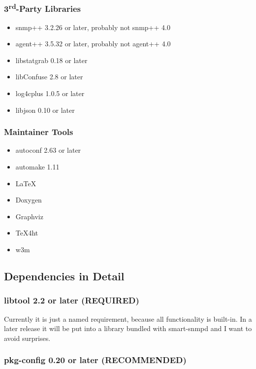 \subsubsection{3\textsuperscript{rd}-Party Libraries}

\begin{itemize}
\item{snmp++ 3.2.26 or later, probably not snmp++ 4.0}
\item{agent++ 3.5.32 or later, probably not agent++ 4.0}
\item{libstatgrab 0.18 or later}
\item{libConfuse 2.8 or later}
\item{log4cplus 1.0.5 or later}
\item{libjson 0.10 or later}
\end{itemize}

\subsubsection{Maintainer Tools}

\begin{itemize}
\item{autoconf 2.63 or later}
\item{automake 1.11}
\item{\LaTeX}
\item{Doxygen}
\item{Graphviz}
\item{{\TeX}4ht}
\item{w3m}
\end{itemize}

\subsection{Dependencies in Detail}

\subsubsection{libtool 2.2 or later (REQUIRED)}

Currently it is just a named requirement, because all functionality is
built-in. In a later release it will be put into a library bundled with
smart-snmpd and I want to avoid surprises.

\subsubsection{pkg-config 0.20 or later (RECOMMENDED)}


